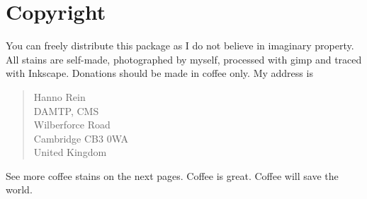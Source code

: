 \documentclass{article}
\begin{document}
\section{Copyright}
You can freely distribute this package as I do not believe in imaginary
property. All stains are self-made, photographed by myself, processed
with gimp and traced with Inkscape.  Donations should be made in coffee
only. My address is
\begin{quote}
Hanno Rein\\
DAMTP, CMS\\
Wilberforce Road\\
Cambridge CB3 0WA\\
United Kingdom
\end{quote}
See more coffee stains on the next pages.
\newpage
{}
Coffee is great.
\newpage
{}
Coffee will save the world.
\end{document}
